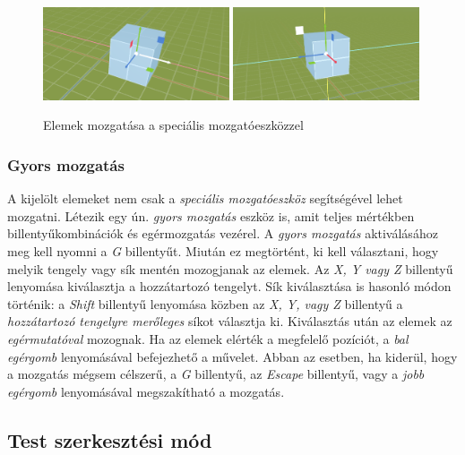 \begin{figure}[H]
    \centering
    \includegraphics[width=0.49\textwidth]{parts/user-documentation/editor/images/move_in_action.png}
    \includegraphics[width=0.49\textwidth]{parts/user-documentation/editor/images/move_in_action_plane.png}
    \caption{Elemek mozgatása a speciális mozgatóeszközzel}
\end{figure}

\subsubsection{Gyors mozgatás}

A kijelölt elemeket nem csak a \emph{speciális mozgatóeszköz} segítségével lehet mozgatni. Létezik
egy ún. \emph{gyors mozgatás} eszköz is, amit teljes mértékben billentyűkombinációk és egérmozgatás
vezérel. A \emph{gyors mozgatás} aktiválásához meg kell nyomni a \emph{G} billentyűt. Miután ez
megtörtént, ki kell választani, hogy melyik tengely vagy sík mentén mozogjanak az elemek. Az
\emph{X, Y vagy Z} billentyű lenyomása kiválasztja a hozzátartozó tengelyt. Sík kiválasztása is
hasonló módon történik: a \emph{Shift} billentyű lenyomása közben az \emph{X, Y, vagy Z} billentyű
a \emph{hozzátartozó tengelyre merőleges} síkot választja ki. Kiválasztás után az elemek az
\emph{egérmutatóval} mozognak. Ha az elemek elérték a megfelelő pozíciót, a \emph{bal egérgomb}
lenyomásával befejezhető a művelet. Abban az esetben, ha kiderül, hogy a mozgatás mégsem célszerű,
a \emph{G} billentyű, az \emph{Escape} billentyű, vagy a \emph{jobb egérgomb} lenyomásával megszakítható a mozgatás.

\subsection{Test szerkesztési mód}

